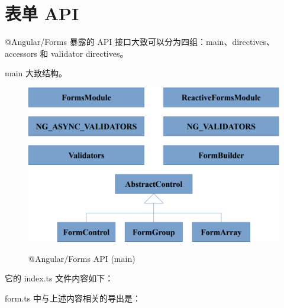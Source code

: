 \section{表单 API}


@Angular/Forms 暴露的 API 接口大致可以分为四组：main、directives、accessors 和 validator directives。


main 大致结构。

\begin{figure}[!hbt]
  \centering
  \caption{@Angular/Forms API (main)}
  \includegraphics[width=0.75\linewidth]{15_the_forms_package/forms_api_main}
  \label{fig:forms_api_main}
\end{figure}


它的 index.ts 文件内容如下：




form.ts 中与上述内容相关的导出是：




